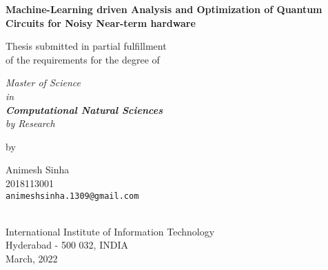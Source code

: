 \thispagestyle{empty}
\begin{center}
\vspace*{1.5cm}
{\Large \bf Machine-Learning driven Analysis and Optimization of Quantum Circuits for Noisy Near-term hardware}

\vspace*{3.75cm}
{\large Thesis submitted in partial fulfillment\\}
{\large  of the requirements for the degree of \\}

\vspace*{1cm}
{\it {\large Master of Science \\ in \\ \textbf{Computational Natural Sciences} \\ by Research}\\}
    

\vspace*{1cm}
{\large by}

\vspace*{5mm}
{\large Animesh Sinha\\}
{\large 2018113001\\
{\small \tt animeshsinha.1309@gmail.com}}


\vspace*{4.0cm}
{\\}
{\large International Institute of Information Technology\\}
{\large Hyderabad - 500 032, INDIA\\}
{\large March, 2022\\}
\end{center}